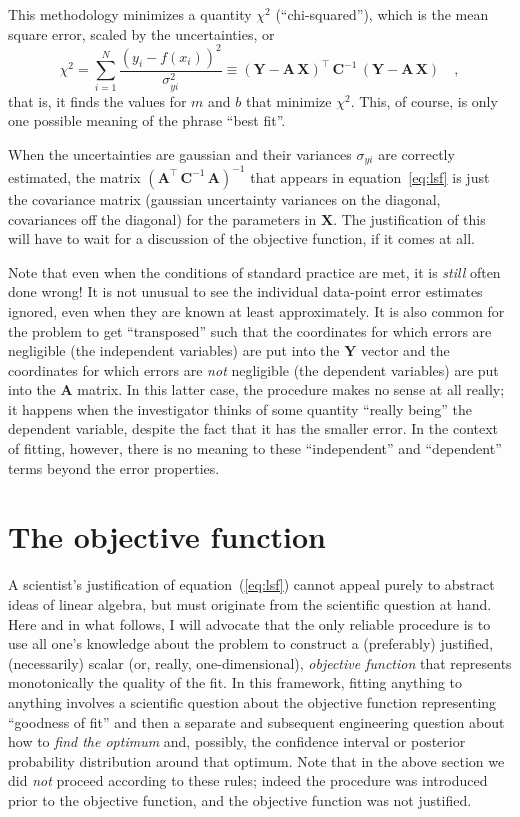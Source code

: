 \documentclass[12pt]{article}
\newcommand{\mmatrix}[1]{\boldsymbol{#1}}
\newcommand{\inverse}[1]{{#1}^{-1}}
\newcommand{\transpose}[1]{{#1}^{\scriptscriptstyle \top}}
\newcommand{\mA}{\mmatrix{A}}
\newcommand{\mAT}{\transpose{\mA}}
\newcommand{\mC}{\mmatrix{C}}
\newcommand{\mCinv}{\inverse{\mC}}
\newcommand{\mX}{\mmatrix{X}}
\newcommand{\mY}{\mmatrix{Y}}
\begin{document}
This methodology minimizes a quantity $\chi^2$ (``chi-squared''),
which is the mean square error, scaled by the uncertainties, or
\begin{equation}
\chi^2
 = \sum_{i=1}^N \frac{\left(y_i - f(x_i)\right)^2}{\sigma_{yi}^2}
 \equiv \transpose{\left(\mY-\mA\,\mX\right)}\,\mCinv\,\left(\mY-\mA\,\mX\right)
 \quad ,
\end{equation}
that is, it finds the values for $m$ and $b$ that minimize $\chi^2$.
This, of course, is only one possible meaning of the phrase ``best
fit''.

When the uncertainties are gaussian and their variances $\sigma_{yi}$
are correctly estimated, the matrix
$\inverse{\left(\mAT\,\mCinv\,\mA\right)}$ that appears in
equation~\ref{eq:lsf} is just the covariance matrix (gaussian
uncertainty variances on the diagonal, covariances off the diagonal)
for the parameters in $\mX$.  The justification of this will have to
wait for a discussion of the objective function, if it comes at all.

Note that even when the conditions of standard practice are met, it is
\emph{still} often done wrong!  It is not unusual to see the
individual data-point error estimates ignored, even when they are
known at least approximately.  It is also common for the problem to
get ``transposed'' such that the coordinates for which errors are
negligible (the independent variables) are put into the $\mY$ vector
and the coordinates for which errors are \emph{not} negligible (the
dependent variables) are put into the $\mA$ matrix.  In this latter
case, the procedure makes no sense at all really; it happens when the
investigator thinks of some quantity ``really being'' the dependent
variable, despite the fact that it has the smaller error.  In the
context of fitting, however, there is no meaning to these
``independent'' and ``dependent'' terms beyond the error properties.

\section{The objective function}

A scientist's justification of equation~(\ref{eq:lsf}) cannot appeal
purely to abstract ideas of linear algebra, but must originate from
the scientific question at hand.  Here and in what follows, I will
advocate that the only reliable procedure is to use all one's
knowledge about the problem to construct a (preferably) justified,
(necessarily) scalar (or, really, one-dimensional), \emph{objective
function} that represents monotonically the quality of the fit.  In
this framework, fitting anything to anything involves a scientific
question about the objective function representing ``goodness of fit''
and then a separate and subsequent engineering question about how to
\emph{find the optimum} and, possibly, the confidence interval or
posterior probability distribution around that optimum.  Note that in
the above section we did \emph{not} proceed according to these rules;
indeed the procedure was introduced prior to the objective function,
and the objective function was not justified.
\end{document}

